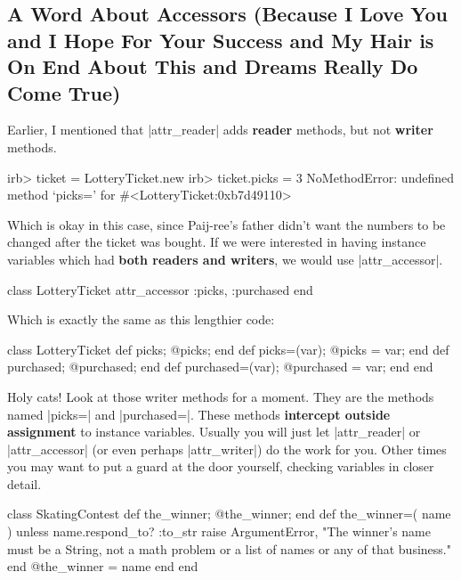 \documentclass[12pt,twoside]{report}
\begin{document}
\subsection{A Word About Accessors (Because I Love You and I Hope For
  Your Success and My Hair is On End About This and Dreams Really Do
  Come True)}



Earlier, I mentioned that \rubyinline|attr_reader|
adds {\bf reader} methods, but not {\bf writer} methods.


\begin{consolecode}

 irb> ticket = LotteryTicket.new
 irb> ticket.picks = 3
 NoMethodError: undefined method `picks=' for #<LotteryTicket:0xb7d49110>

\end{consolecode}


Which is okay in this case, since Paij-ree's father didn't want the
numbers to be changed after the ticket was bought.  If we were
interested in having instance variables which had {\bf both readers
  and writers}, we would use
\rubyinline|attr_accessor|.


\begin{rubycode}

 class LotteryTicket
   attr_accessor :picks, :purchased
 end

\end{rubycode}


Which is exactly the same as this lengthier code:


\begin{rubycode}

 class LotteryTicket
   def picks;           @picks;            end
   def picks=(var);     @picks = var;      end
   def purchased;       @purchased;        end
   def purchased=(var); @purchased = var;  end
 end

\end{rubycode}


Holy cats!  Look at those writer methods for a moment.  They are the
methods named \rubyinline|picks=| and
\rubyinline|purchased=|.  These methods {\bf intercept
  outside assignment} to instance variables. Usually you will just let
\rubyinline|attr_reader| or
\rubyinline|attr_accessor| (or even perhaps
\rubyinline|attr_writer|) do the work for you. Other
times you may want to put a guard at the door yourself, checking
variables in closer detail.


\begin{rubycode}

 class SkatingContest
   def the_winner; @the_winner; end
   def the_winner=( name )
     unless name.respond_to? :to_str
       raise ArgumentError, "The winner's name must be a String,
         not a math problem or a list of names or any of that business."
     end
     @the_winner = name
   end
 end

\end{rubycode}
\end{document}
